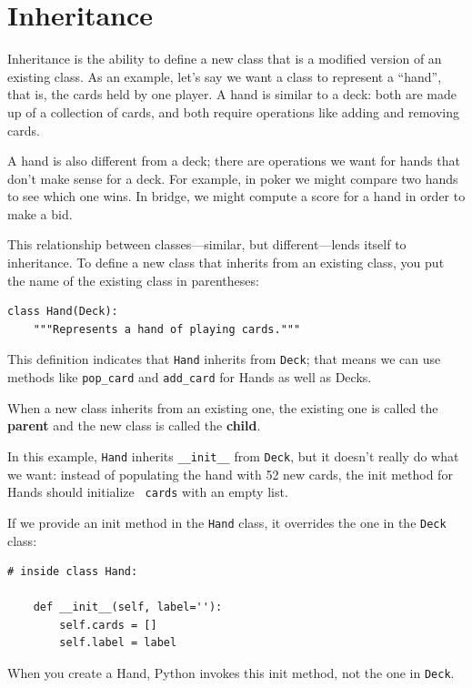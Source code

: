 \documentclass[10pt]{book}
\begin{document}
\section{Inheritance}

Inheritance is the ability to define a new class that is a modified
version of an existing class.  As an example, let's say we want a
class to represent a ``hand'', that is, the cards held by one player.
A hand is similar to a deck: both are made up of a collection of
cards, and both require operations like adding and removing cards.

A hand is also different from a deck; there are operations we want for
hands that don't make sense for a deck.  For example, in poker we
might compare two hands to see which one wins.  In bridge, we might
compute a score for a hand in order to make a bid.

This relationship between classes---similar, but different---lends
itself to inheritance.
To define a new class that inherits from an existing class,
you put the name of the existing class in parentheses:

\begin{verbatim}
class Hand(Deck):
    """Represents a hand of playing cards."""
\end{verbatim}
%
This definition indicates that {\tt Hand} inherits from {\tt Deck};
that means we can use methods like \verb"pop_card" and \verb"add_card"
for Hands as well as Decks.

When a new class inherits from an existing one, the existing
one is called the {\bf parent} and the new class is
called the {\bf child}.

In this example, {\tt Hand} inherits \verb"__init__" from {\tt Deck},
but it doesn't really do what we want: instead of populating the hand
with 52 new cards, the init method for Hands should initialize {\tt
  cards} with an empty list.   

If we provide an init method in the {\tt Hand} class, it overrides the
one in the {\tt Deck} class:

\begin{verbatim}
# inside class Hand:

    def __init__(self, label=''):
        self.cards = []
        self.label = label
\end{verbatim}
%
When you create a Hand, Python invokes this init method, not the
one in {\tt Deck}.
\end{document}
